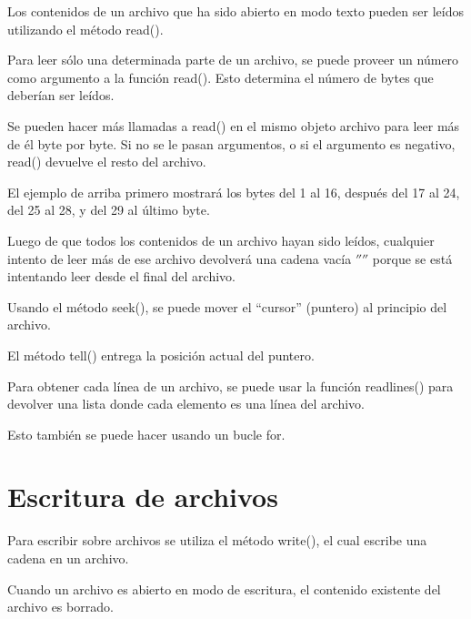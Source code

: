 \documentclass{report}
\newcommand{\doble}[1]{``#1''}
\begin{document}
{Los contenidos de un archivo que ha sido abierto en modo texto pueden ser leídos utilizando el método read().


Para leer sólo una determinada parte de un archivo, se puede proveer un número como argumento a la función read(). Esto determina el número de bytes que deberían ser leídos.

Se pueden hacer más llamadas a read() en el mismo objeto archivo para leer más de él byte por byte. Si no se le pasan argumentos, o si el argumento es negativo, read() devuelve el resto del archivo.


El ejemplo de arriba primero mostrará los bytes del 1 al 16, después del 17 al 24, del 25 al 28, y del 29 al último byte.

Luego de que todos los contenidos de un archivo hayan sido leídos, cualquier intento de leer más de ese archivo devolverá una cadena vacía $''$$''$ porque se está intentando leer desde el final del archivo.


Usando el método seek(), se puede mover el \doble{cursor} (puntero) al principio del archivo.


El método tell() entrega la posición actual del puntero.


Para obtener cada línea de un archivo, se puede usar la función readlines() para devolver una lista donde cada elemento es una línea del archivo.


Esto también se puede hacer usando un bucle for.


\section{Escritura de archivos}

Para escribir sobre archivos se utiliza el método write(), el cual escribe una cadena en un archivo.


Cuando un archivo es abierto en modo de escritura, el contenido existente del archivo es borrado.

}
\end{document}
